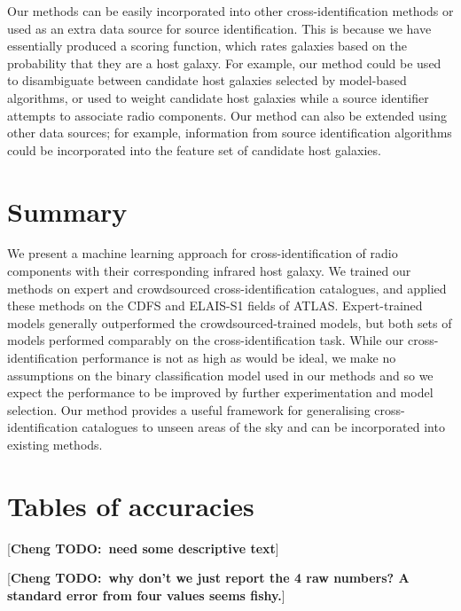 \documentclass[fleqn,usenatbib,usedcolumn]{mnras}
\newcommand{\cheng}[1]{ {\color{teal}[{\bf Cheng TODO:~{#1}}]} }
\begin{document}
    Our methods can be easily incorporated into other cross-identification
    methods or used as an extra data source for source identification. This is
    because we have essentially produced a scoring function, which rates
    galaxies based on the probability that they are a host galaxy. For
    example, our method could be used to disambiguate between candidate host
    galaxies selected by model-based algorithms, or used to weight candidate
    host galaxies while a source identifier attempts to associate radio
    components. Our method can also be extended using other data sources; for
    example, information from source identification algorithms could be
    incorporated into the feature set of candidate host galaxies.

\section{Summary}

  We present a machine learning approach for cross-identification of radio
  components with their corresponding infrared host galaxy. We trained our
  methods on expert and crowdsourced cross-identification catalogues, and
  applied these methods on the CDFS and ELAIS-S1 fields of ATLAS.
  Expert-trained models generally outperformed the crowdsourced-trained
  models, but both sets of models performed comparably on the
  cross-identification task. While our cross-identification performance is not
  as high as would be ideal, we make no assumptions on the binary
  classification model used in our methods and so we expect the performance to
  be improved by further experimentation and model selection. Our method
  provides a useful framework for generalising cross-identification catalogues
  to unseen areas of the sky and can be incorporated into existing methods.

%



\clearpage
\appendix
\section{Tables of accuracies}

\cheng{need some descriptive text}

\cheng{why don't we just report the 4 raw numbers? A standard error from four values seems fishy.}
\end{document}
